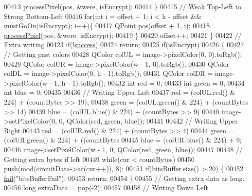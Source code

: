 \begin{DoxyCode}
00413             \hyperlink{class_model_p_c_a1171f9fe1550133dc9053a46b4e5bcfd}{processPixel}(pos, &were, isEncrypt);
00414         \}
00415         \textcolor{comment}{// Weak Top-Left to Strong Bottom-Left}
00416         \textcolor{keywordflow}{for}(\textcolor{keywordtype}{int} i = offset + 1; i < h - offset && mustGoOn(isEncrypt); i++)\{
00417             QPoint pos(offset + 1, i);
00418             \hyperlink{class_model_p_c_a1171f9fe1550133dc9053a46b4e5bcfd}{processPixel}(pos, &were, isEncrypt);
00419         \}
00420         offset++;
00421     \}
00422     \textcolor{comment}{// Extra writing}
00423     \textcolor{keywordflow}{if}(!\hyperlink{class_model_p_c_a945ffbbc44a832b953c191debd448f4c}{success})
00424         \textcolor{keywordflow}{return};
00425     \textcolor{keywordflow}{if}(isEncrypt)
00426     \{
00427         \textcolor{comment}{// Getting past colors}
00428         QColor colUL = image->pixelColor(0, 0).toRgb();
00429         QColor colUR = image->pixelColor(w - 1, 0).toRgb();
00430         QColor colDL = image->pixelColor(0, h - 1).toRgb();
00431         QColor colDR = image->pixelColor(w - 1, h - 1).toRgb();
00432         \textcolor{keywordtype}{int} red = 0;
00433         \textcolor{keywordtype}{int} green = 0;
00434         \textcolor{keywordtype}{int} blue = 0;
00435 
00436         \textcolor{comment}{// Writing Upper Left}
00437         red = (colUL.red() & 224) + (countBytes >> 19);
00438         green = (colUL.green() & 224) + (countBytes >> 14) %
00439         blue = (colUL.blue() & 224) + (countBytes >> 9) %
00440         image->setPixelColor(0, 0, QColor(red, green, blue));
00441 
00442         \textcolor{comment}{// Writing Upper Right}
00443         red = (colUR.red() & 224) + (countBytes >> 4) %
00444         green = (colUR.green() & 224) + ((countBytes %
00445         blue = (colUR.blue() & 224) + 9;
00446         image->setPixelColor(w - 1, 0, QColor(red, green, blue));
00447 
00448         \textcolor{comment}{// Getting extra bytes if left}
00449         \textcolor{keywordflow}{while}(cur < countBytes)
00450             push(mod(circuitData->at(cur++)), 8);
00451         \textcolor{keywordflow}{if}(bitsBuffer.size() > 20) \{
00452             \hyperlink{class_model_p_c_a47464b59b7e37fcee25e55475708aabd}{fail}(\textcolor{stringliteral}{"bitsBufferFail"});
00453             \textcolor{keywordflow}{return};
00454         \}
00455         \textcolor{comment}{// Getting extra data as long.}
00456         \textcolor{keywordtype}{long} extraData = pop(-2);
00457 
00458         \textcolor{comment}{// Writing Down Left}

\end{DoxyCode}
